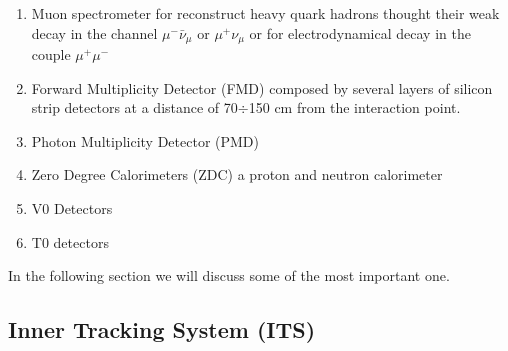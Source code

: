 \documentclass[12pt,a4paper]{book}
\begin{document}
\begin{itemize}
		\begin{enumerate}
			\item Muon spectrometer for reconstruct heavy quark hadrons thought their weak decay in the channel $\mu^- \bar{\nu}_\mu$ or $\mu^+ \nu_\mu$  or for electrodynamical decay in the couple $\mu^+ \mu^-$
			\item Forward Multiplicity Detector (FMD) composed by several layers of silicon strip detectors at a distance of 70$\div$150 cm from the interaction point.
			\item Photon Multiplicity Detector (PMD)
			\item Zero Degree Calorimeters (ZDC) a proton and neutron calorimeter
			\item V0 Detectors
			\item T0 detectors
		\end{enumerate}
\end{itemize}
\cite{Padhan:2924203} \cite{Arata:2922803}

	In the following section we will discuss some of the most important one.

	\subsection{Inner Tracking System (ITS)}
\end{document}
